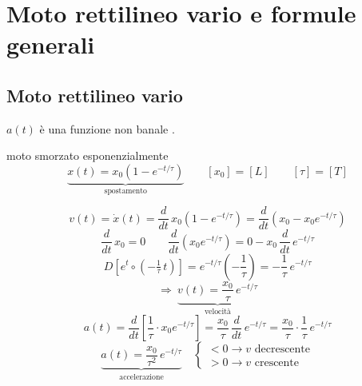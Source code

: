 \documentclass[11pt,a4paper,openany]{report}
\begin{document}
\chapter{Moto rettilineo vario e formule generali}

\section{Moto rettilineo vario}
$a(t)$ è una funzione non banale \implica {}.

\begin{esempio}{moto smorzato esponenzialmente}
\[
  \underbrace{x(t) = x_0\left(1 - e^{-t/\tau}\right)}_{\text{spostamento}}
  \qquad [x_0] = [L] \qquad [\tau] = [T]
\]
\begin{disegno}
\end{disegno}
\[
  v(t) = \dot{x}(t) = \frac{d}{dt}\,x_0\left(1 - e^{-t/\tau}\right) = \frac{d}{dt}\left(x_0 - x_0 e^{-t/\tau}\right)
\]
\[
  \frac{d}{dt}\,x_0 = 0
  \qquad
  \frac{d}{dt}\left(x_0 e^{-t/\tau}\right) = 0 - x_0\,\frac{d}{dt}\,e^{-t/\tau}
\]
\[
  D\!\left[e^{t} \circ \left(-\tfrac{1}{\tau}\,t\right)\right] = e^{-t/\tau}\left(-\frac{1}{\tau}\right) = -\frac{1}{\tau}\,e^{-t/\tau}
\]
\[
  \Rightarrow\ \underbrace{v(t) = \frac{x_0}{\tau}\,e^{-t/\tau}}_{\text{velocità}}
\]
\[
  a(t) = \frac{d}{dt}\left[\frac{1}{\tau}\cdot x_0 e^{-t/\tau}\right]
       = \frac{x_0}{\tau}\,\frac{d}{dt}\,e^{-t/\tau}
       = \frac{x_0}{\tau}\cdot\frac{1}{\tau}\,e^{-t/\tau}
\]
\[
  \underbrace{a(t) = \frac{x_0}{\tau^2}\,e^{-t/\tau}}_{\text{accelerazione}}
  \quad
  \begin{cases}
    < 0 \to v \text{ decrescente} \\
    > 0 \to v \text{ crescente}
  \end{cases}
\]
\end{esempio}

\end{document}
